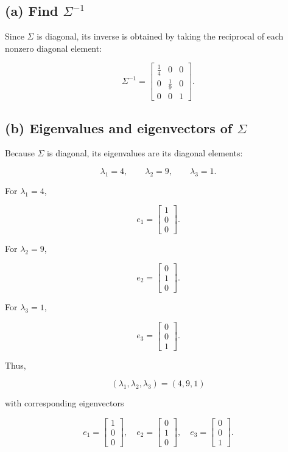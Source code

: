 \documentclass[12pt]{article}
\begin{document}
\subsection*{(a) Find $\Sigma^{-1}$}

Since $\Sigma$ is diagonal, its inverse is obtained by taking the reciprocal of each nonzero diagonal element:

\[
\boxed{
\Sigma^{-1}
=
\begin{bmatrix}
\frac14&0&0\\
0&\frac19&0\\
0&0&1
\end{bmatrix}
}.
\]

\subsection*{(b) Eigenvalues and eigenvectors of $\Sigma$}

Because $\Sigma$ is diagonal, its eigenvalues are its diagonal elements:

\[
\boxed{
\lambda_1=4,\qquad
\lambda_2=9,\qquad
\lambda_3=1
}.
\]

For $\lambda_1=4$,

\[
\boxed{
e_1=
\begin{bmatrix}
1\\
0\\
0
\end{bmatrix}
}.
\]

For $\lambda_2=9$,

\[
\boxed{
e_2=
\begin{bmatrix}
0\\
1\\
0
\end{bmatrix}
}.
\]

For $\lambda_3=1$,

\[
\boxed{
e_3=
\begin{bmatrix}
0\\
0\\
1
\end{bmatrix}
}.
\]

Thus,

\[
\boxed{
(\lambda_1,\lambda_2,\lambda_3)=(4,9,1)
}
\]

with corresponding eigenvectors

\[
\boxed{
e_1=
\begin{bmatrix}
1\\
0\\
0
\end{bmatrix},
\quad
e_2=
\begin{bmatrix}
0\\
1\\
0
\end{bmatrix},
\quad
e_3=
\begin{bmatrix}
0\\
0\\
1
\end{bmatrix}.
}
\]
\end{document}
